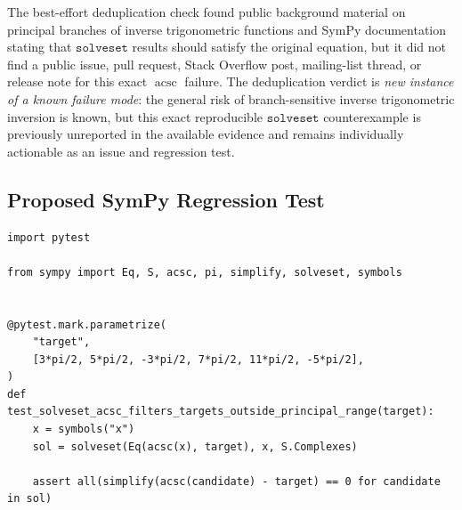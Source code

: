 \documentclass[11pt]{article}
\begin{document}
The best-effort deduplication check found public background material on principal branches of inverse trigonometric functions and SymPy documentation stating that \(\texttt{solveset}\) results should satisfy the original equation, but it did not find a public issue, pull request, Stack Overflow post, mailing-list thread, or release note for this exact \(\operatorname{acsc}\) failure. The deduplication verdict is \emph{new instance of a known failure mode}: the general risk of branch-sensitive inverse trigonometric inversion is known, but this exact reproducible \(\texttt{solveset}\) counterexample is previously unreported in the available evidence and remains individually actionable as an issue and regression test.

\subsection{Proposed SymPy Regression Test}

\medskip

\begin{lstlisting}[style=bugpython]
import pytest

from sympy import Eq, S, acsc, pi, simplify, solveset, symbols


@pytest.mark.parametrize(
    "target",
    [3*pi/2, 5*pi/2, -3*pi/2, 7*pi/2, 11*pi/2, -5*pi/2],
)
def test_solveset_acsc_filters_targets_outside_principal_range(target):
    x = symbols("x")
    sol = solveset(Eq(acsc(x), target), x, S.Complexes)

    assert all(simplify(acsc(candidate) - target) == 0 for candidate in sol)
\end{lstlisting}
\end{document}
